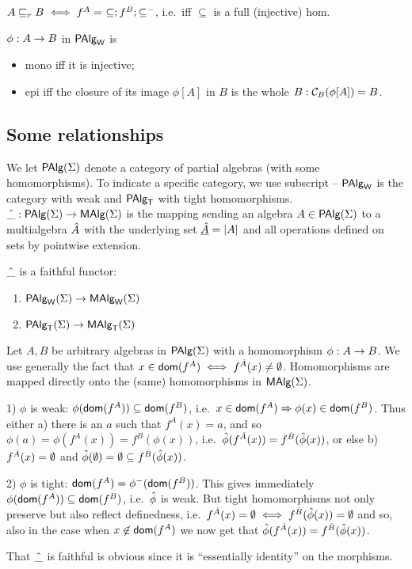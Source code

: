 \documentclass[10pt]{article}
\begin{document}
%
\begin{Fact}
$A\suba_r B \iff f^A =\ \Comp{\Comp{\subseteq}{f^B}}{\subseteq^-}$, i.e.\ iff
$\subseteq$ is a full (injective) hom.
\end{Fact}
%
\begin{Fact}
$\phi:A\rightarrow B$ in $\mbox{\rm\sf PAlg}_{\sf W}$ is 
\begin{itemize}\MyLPar
\item mono iff it is injective;
\item epi iff the closure of its image $\phi[A]$ in $B$ is the whole
$B: {\cal C}_B(\phi[A])=B$.
\end{itemize}
\end{Fact}



\subsection{Some relationships}

We let $\mbox{\rm\sf PAlg}(\Sigma)$ denote a category of partial algebras (with some
homomorphisms). To indicate a specific category, we use subscript --
$\mbox{\rm\sf PAlg}_{\sf W}$ is the category with weak and $\mbox{\rm\sf PAlg}_{\sf T}$ with tight homomorphisms.
$\hat{\_}:\mbox{\rm\sf PAlg}(\Sigma)\rightarrow\mbox{\rm\sf MAlg}(\Sigma)$ is the mapping sending an algebra $A\in\mbox{\rm\sf PAlg}(\Sigma)$
to a multialgebra $\hat{A}$ with the underlying set $\underline {\hat{A}}=|A|$ and all operations defined on sets by pointwise extension.

\begin{Fact}
\label{fa:faith} 
$\hat{\_}$ is a faithful functor:
\begin{enumerate}\MyLPar
\item $\mbox{\rm\sf PAlg}_{\sf W}(\Sigma)\rightarrow\mbox{\rm\sf MAlg}_{\sf W}(\Sigma)$ 
\item $\mbox{\rm\sf PAlg}_{\sf T}(\Sigma)\rightarrow\mbox{\rm\sf MAlg}_{\sf T}(\Sigma)$
\end{enumerate}
\end{Fact}

\begin{Proof}
Let $A,B$ be arbitrary algebras in $\mbox{\rm\sf PAlg}(\Sigma)$ with a homomorphism
$\phi:A\rightarrow B$.  We use generally the fact that $ x\in\mbox{\sf dom}(f^A)
\iff f^{\hat{A}}(x)\not=\emptyset$.  Homomorphisms are mapped directly
onto the (same) homomorphisms in $\mbox{\rm\sf MAlg}(\Sigma)$.

1) $\phi$ is weak: $\phi(\mbox{\sf dom}(f^A))\subseteq\mbox{\sf dom}(f^B)$, i.e.\
$x\in\mbox{\sf dom}(f^A)\Rightarrow \phi(x)\in\mbox{\sf dom}(f^B)$.  Thus either a) there is an
$a$ such that $f^{A}(x) = a$, and so $\phi(a)=\phi(f^A(x))=
f^B(\phi(x))$, i.e.\ $\hat{\phi}(f^{\hat{A}}(x))=f^{\hat{B}}(\hat{\phi}(x))$, or else b) $f^{\hat{A}}(x)=\emptyset$ and
$\hat{\phi}(\emptyset)=\emptyset\subseteq f^{\hat{B}}(\hat{\phi}(x))$.

2) $\phi$ is tight: $\mbox{\sf dom}(f^A)=\phi^-(\mbox{\sf dom}(f^B))$. This gives
immediately $\phi(\mbox{\sf dom}(f^A))\subseteq\mbox{\sf dom}(f^B)$, i.e.\ $\hat{\phi}$ is
weak. But tight homomorphisms not only preserve but also reflect definedness,
i.e.\ $f^{\hat{A}}(x)=\emptyset\iff f^{\hat{B}}(\hat{\phi}(x))=\emptyset$ and so, also
in the case when $ x\not\in\mbox{\sf dom}(f^A)$ we now get that
$\hat{\phi}(f^{\hat{A}}(x))= f^{\hat{B}}(\hat{\phi}(x))$.

That $\hat{\_}$ is faithful is obvious since it is ``essentially
identity'' on the morphisms.
\end{Proof}
\end{document}
